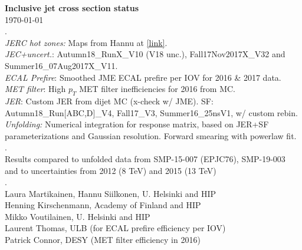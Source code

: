 \documentclass[landscape,10pt]{beamer} %
\begin{document}
\begin{centering}
{\bf Inclusive jet cross section status}\\
\today\\
{. }\\
{\em JERC hot zones:} Maps from Hannu at \href{http://hsiikone.web.cern.ch/hsiikone/hotcoldjets/}{[link]}.\\
{\em JEC+uncert.}: Autumn18\_RunX\_V10 (V18 unc.), Fall17Nov2017X\_V32 and Summer16\_07Aug2017X\_V11.\\%
{\em ECAL Prefire}: Smoothed JME ECAL prefire per IOV for 2016 \& 2017 data.\\
{\em MET filter}: High $p_T$ MET filter inefficiencies for 2016 from MC.\\
{\em JER}: Custom JER from dijet MC (x-check w/ JME). SF: Autumn18\_Run[ABC,D]\_V4, Fall17\_V3, Summer16\_25nsV1, w/ custom rebin.\\
{\em Unfolding:} Numerical integration for response matrix, based on JER+SF parameterizations and Gaussian resolution. Forward smearing with powerlaw fit.\\ 
{. }\\
Results compared to unfolded data from SMP-15-007 (EPJC76), SMP-19-003\\
and to uncertainties from 2012 (8 TeV) and 2015 (13 TeV)\\
{. }\\
Laura Martikainen, Hannu Siilkonen, U. Helsinki and HIP\\
Henning Kirschenmann, Academy of Finland and HIP\\
Mikko Voutilainen, U. Helsinki and HIP\\
Laurent Thomas, ULB (for ECAL prefire efficiency per IOV)\\
Patrick Connor, DESY (MET filter efficiency in 2016)\\
\end{centering}
\end{document}
